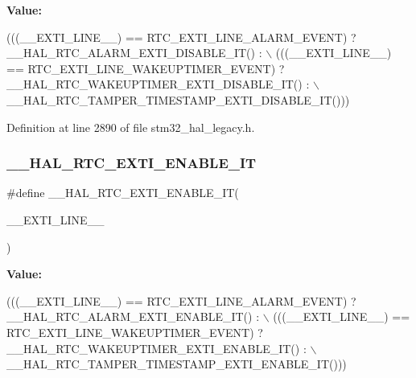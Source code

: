 {\bfseries Value\+:}
\begin{DoxyCode}
(((\_\_EXTI\_LINE\_\_) == RTC\_EXTI\_LINE\_ALARM\_EVENT) ? \_\_HAL\_RTC\_ALARM\_EXTI\_DISABLE\_IT() : \(\backslash\)
                                                  (((\_\_EXTI\_LINE\_\_) == RTC\_EXTI\_LINE\_WAKEUPTIMER\_EVENT) ? 
      \_\_HAL\_RTC\_WAKEUPTIMER\_EXTI\_DISABLE\_IT() : \(\backslash\)
                                                      \_\_HAL\_RTC\_TAMPER\_TIMESTAMP\_EXTI\_DISABLE\_IT()))
\end{DoxyCode}


Definition at line 2890 of file stm32\+\_\+hal\+\_\+legacy.\+h.

\mbox{\label{group___h_a_l___r_t_c___aliased___macros_ga16764e0df245c740813dbeb302e67da5}} 
\subsubsection{\texorpdfstring{\+\_\+\+\_\+\+H\+A\+L\+\_\+\+R\+T\+C\+\_\+\+E\+X\+T\+I\+\_\+\+E\+N\+A\+B\+L\+E\+\_\+\+IT}{\_\_HAL\_RTC\_EXTI\_ENABLE\_IT}}
{\footnotesize\ttfamily \#define \+\_\+\+\_\+\+H\+A\+L\+\_\+\+R\+T\+C\+\_\+\+E\+X\+T\+I\+\_\+\+E\+N\+A\+B\+L\+E\+\_\+\+IT(\begin{DoxyParamCaption}\item[{}]{\+\_\+\+\_\+\+E\+X\+T\+I\+\_\+\+L\+I\+N\+E\+\_\+\+\_\+ }\end{DoxyParamCaption})}

{\bfseries Value\+:}
\begin{DoxyCode}
(((\_\_EXTI\_LINE\_\_)  == RTC\_EXTI\_LINE\_ALARM\_EVENT) ? \_\_HAL\_RTC\_ALARM\_EXTI\_ENABLE\_IT() : \(\backslash\)
                                                  (((\_\_EXTI\_LINE\_\_) == RTC\_EXTI\_LINE\_WAKEUPTIMER\_EVENT) ? 
      \_\_HAL\_RTC\_WAKEUPTIMER\_EXTI\_ENABLE\_IT() : \(\backslash\)
                                                      \_\_HAL\_RTC\_TAMPER\_TIMESTAMP\_EXTI\_ENABLE\_IT()))
\end{DoxyCode}


